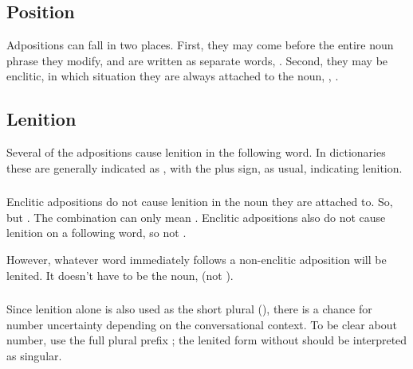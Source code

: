 \subsection{Position} Adpositions can fall in two places.  First,
they may come before the entire noun phrase they modify, and are
written as separate words, 
  .  Second, they may
be enclitic, in which situation they are always attached to the noun,
 ,
 .\label{syn:adp:position}

\subsection{Lenition} Several of the adpositions
cause lenition in the following word.  In dictionaries these are
generally indicated as , with the plus sign, as usual,
indicating lenition.

\subsubsection{} Enclitic adpositions do not cause lenition in the
noun they are attached to.  So,   but
.  The combination  can only mean .  Enclitic adpositions also do not cause lenition on a
following word, so  
not .

However, whatever word immediately follows a non-enclitic adposition
will be lenited.  It doesn't have to be the noun, 
 (not ).

\subsubsection{} Since lenition alone is also used as the short plural
(), there is a chance for number
uncertainty depending on the conversational context.  To be clear
about number, use the full plural prefix ; the lenited form
without  should be interpreted as singular.
\label{syn:adp:short-plural}


